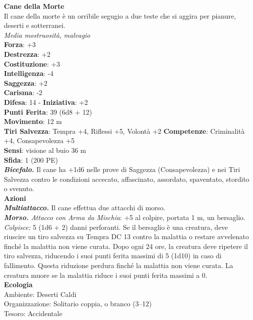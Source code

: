 \begin{multicols}{2}
\medskip\textbf{Cane della Morte}\\
Il cane della morte è un orribile segugio a due teste che si aggira per pianure, deserti e sotterranei.\\
\emph{Media mostruosità, malvagio}\\
\textbf{Forza}: +3\\
\textbf{Destrezza}: +2\\
\textbf{Costituzione}: +3\\
\textbf{Intelligenza}: -4\\
\textbf{Saggezza}: +2\\
\textbf{Carisma}: -2\\
\textbf{Difesa}: 14 - \textbf{Iniziativa}: +2\\
\textbf{Punti Ferita}: 39 (6d8 + 12)\\
\textbf{Movimento}: 12 m\\
\textbf{Tiri Salvezza}: Tempra +4, Riflessi +5, Volontà +2 
\textbf{Competenze}: Criminalità +4, Consapevolezza +5\\
\textbf{Sensi}: visione al buio 36 m\\
\textbf{Sfida}: 1 (200 PE)\smallskip\\
\emph{\textbf{Bicefalo.}} Il cane ha +1d6 nelle prove di Saggezza (Consapevolezza) e nei Tiri Salvezza contro le condizioni accecato, affascinato, assordato, spaventato, stordito o svenuto.\\
\smallskip\textbf{Azioni}\\
\emph{\textbf{Multiattacco.}} Il cane effettua due attacchi di morso.\\
\emph{\textbf{Morso.} Attacco con Arma da Mischia}: +5 al colpire, portata 1 m, un bersaglio.\\
\emph{Colpisce:} 5 (1d6 + 2) danni perforanti. Se il bersaglio è una creatura, deve riuscire un tiro salvezza su Tempra DC  13 contro la malattia o restare avvelenato finché la malattia non viene curata. Dopo ogni 24 ore, la creatura deve ripetere il tiro salvezza, riducendo i suoi punti ferita massimi di 5 (1d10) in caso di fallimento. Questa riduzione perdura finché la malattia non viene curata. La creatura muore se la malattia riduce i suoi punti ferita massimi a 0. \\
\textbf{Ecologia}\\
Ambiente: Deserti Caldi\\
Organizzazione: Solitario coppia, o branco (3–12)\\
Tesoro: Accidentale\\

\end{multicols}
